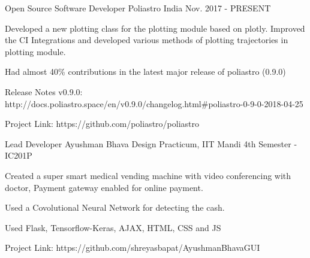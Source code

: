 \begin{cventries}


\cventry
{Open Source Software Developer} %
{Poliastro} %
{India} %
{Nov. 2017 - PRESENT} %
{ %
\begin{cvitems}
\item {Developed a new plotting class for the plotting module based on plotly. Improved the CI Integrations and developed various methods of plotting trajectories in plotting module.}
\item {Had almost 40\% contributions in the latest major release of poliastro (0.9.0)}
\item {Release Notes v0.9.0: http://docs.poliastro.space/en/v0.9.0/changelog.html#poliastro-0-9-0-2018-04-25}
\item {Project Link: https://github.com/poliastro/poliastro}
\end{cvitems}
}


\cventry
{Lead Developer} %
{Ayushman Bhava} %
{Design Practicum, IIT Mandi} %
{4th Semester - IC201P} %
{ %
\begin{cvitems}
\item {Created a super smart medical vending machine with video conferencing with doctor, Payment gateway enabled for online payment.}
\item {Used a Covolutional Neural Network for detecting the cash.}
\item {Used Flask, Tensorflow-Keras, AJAX, HTML, CSS and JS}
\item {Project Link: https://github.com/shreyasbapat/AyushmanBhavaGUI}
\end{cvitems}
}


\end{cventries}
